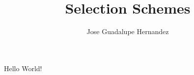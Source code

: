\documentclass[12pt]{report}
\title{Selection Schemes}
\author{Jose Guadalupe Hernandez}
\begin{document}
Hello World!
\end{document}
